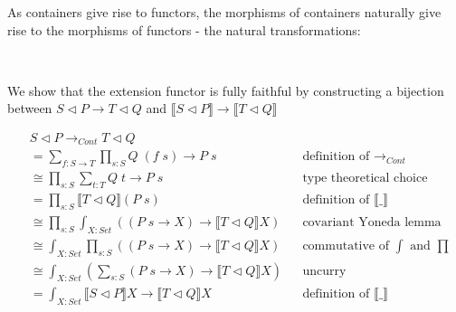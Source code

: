 As containers give rise to functors, the morphisms of containers naturally give rise to the morphisms of functors - the natural transformations:

\begin{code}%
\>[0]\AgdaSpace{}%
\AgdaSymbol{:}\AgdaSpace{}%
\AgdaSpace{}%
\AgdaSpace{}%
\AgdaSpace{}%
\AgdaSpace{}%
\AgdaSymbol{(}\AgdaSpace{}%
\AgdaSymbol{:}\AgdaSpace{}%
\AgdaSymbol{)}\AgdaSpace{}%
\AgdaSpace{}%
\AgdaSpace{}%
\AgdaSpace{}%
\AgdaSpace{}%
\AgdaSpace{}%
\AgdaSpace{}%
\AgdaSpace{}%
\AgdaSpace{}%
\AgdaSpace{}%
\<%
\\
\>[0]\AgdaSpace{}%
\AgdaSpace{}%
\AgdaSpace{}%
\AgdaSpace{}%
\AgdaSpace{}%
\AgdaSpace{}%
\AgdaSymbol{(}\AgdaSpace{}%
\AgdaOperator{\AgdaInductiveConstructor{,}}\AgdaSpace{}%
\AgdaSymbol{)}\AgdaSpace{}%
\AgdaSymbol{=}\AgdaSpace{}%
\AgdaSpace{}%
\AgdaSpace{}%
\AgdaOperator{\AgdaInductiveConstructor{,}}\AgdaSpace{}%
\AgdaSpace{}%
\AgdaSpace{}%
\AgdaSpace{}%
\<%
\end{code}

We show that the extension functor is fully faithful by constructing a bijection between $S \triangleleft P \to T \triangleleft Q$ and $\llbracket S \triangleleft P \rrbracket \to \llbracket T \triangleleft Q \rrbracket$

\begin{align*}
& S \triangleleft P \rightarrow_{Cont} T \triangleleft Q \\
&= \sum_{f : S \to T} \prod_{s : S} Q \; (f \; s) \to P \; s && \text{definition of $\rightarrow_{Cont}$} \\
&\cong \prod_{s : S} \sum_{t : T} Q \; t \to P \; s && \text{type theoretical choice} \\
&= \prod_{s : S} \llbracket T \triangleleft Q \rrbracket (P \; s) && \text{definition of $\llbracket \_ \rrbracket$} \\
&\cong \prod_{s : S} \int_{X : Set} ((P \; s \to X) \to \llbracket T \triangleleft Q \rrbracket X) && \text{covariant Yoneda lemma} \\
&\cong \int_{X : Set} \prod_{s : S} ((P \; s \to X) \to \llbracket T \triangleleft Q \rrbracket X) && \text{commutative of $\int$ and $\prod$} \\
&\cong \int_{X : Set} (\sum_{s : S} (P \; s \to X) \to \llbracket T \triangleleft Q \rrbracket X) && \text{uncurry} \\
&= \int_{X : Set} \llbracket S \triangleleft P \rrbracket X \to \llbracket T \triangleleft Q \rrbracket X && \text{definition of $\llbracket \_ \rrbracket$} \\
\end{align*}

